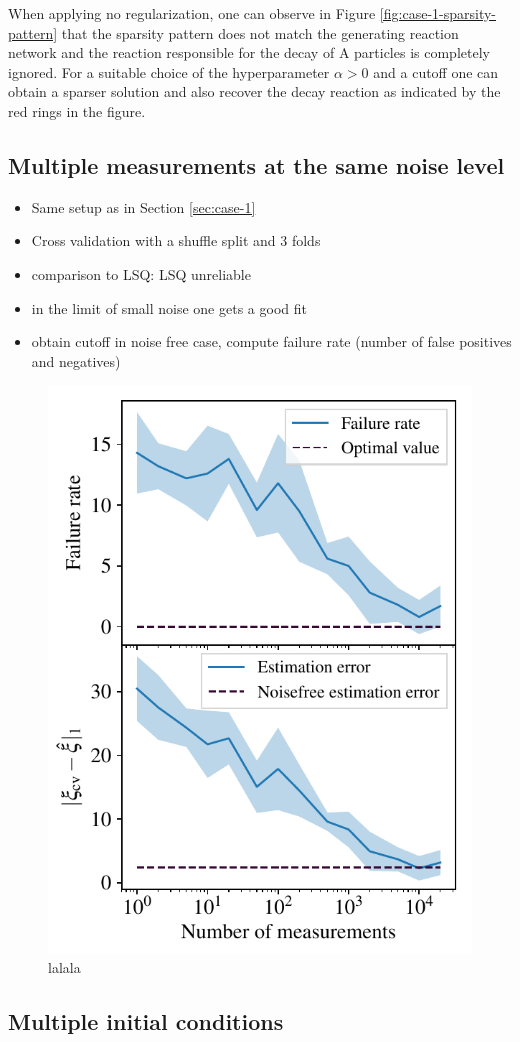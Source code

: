 \documentclass[oneside, abstracton, titlepage]{scrartcl}
\begin{document}
	When applying no regularization, one can observe in Figure \ref{fig:case-1-sparsity-pattern} that the sparsity pattern does not match the generating reaction network and the reaction responsible for the decay of $\mathrm{A}$ particles is completely ignored. For a suitable choice of the hyperparameter $\alpha > 0$ and a cutoff one can obtain a sparser solution and also recover the decay reaction as indicated by the red rings in the figure.
	
	\subsection{Multiple measurements at the same noise level}\label{sec:case-2}
	
	\begin{itemize}
		\item Same setup as in Section \ref{sec:case-1}
		\item Cross validation with a shuffle split and 3 folds
		\item comparison to LSQ: LSQ unreliable
		\item in the limit of small noise one gets a good fit
		\item obtain cutoff in noise free case, compute failure rate (number of false positives and negatives)
	\end{itemize}

	\begin{figure}
		\centering
		\includegraphics[width=.5\columnwidth]{./figures_tex/case2}
		\caption{lalala}
	\end{figure}

	\subsection{Multiple initial conditions}\label{sec:case-3}
	
\end{document}
